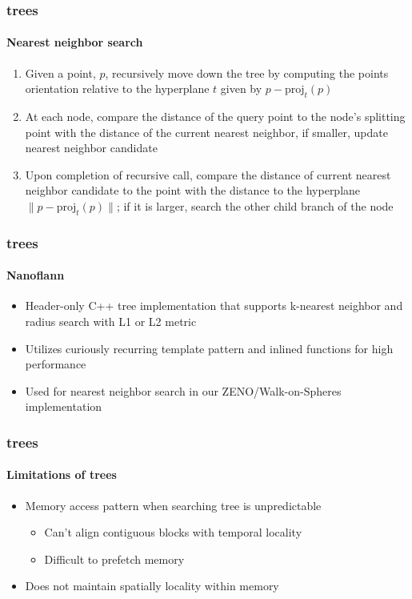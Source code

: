 \begin{frame}
  \frametitle{\kd trees}
  \framesubtitle{Nearest neighbor search}

  \begin{enumerate}
    \item Given a point, $p$, recursively move down the tree by computing the points orientation relative to the 
      hyperplane $t$ given by $p - \text{proj}_t(p)$
    \item At each node, compare the distance of the query point to the node's splitting point with the distance
      of the current nearest neighbor, if smaller, update nearest neighbor candidate
    \item Upon completion of recursive call, compare the distance of current nearest neighbor 
      candidate to the point with the distance to the hyperplane $\|p - \text{proj}_t(p)\|$; 
      if it is larger, search the other child branch of the node
  \end{enumerate}

\end{frame}

\begin{frame}
  \frametitle{\kd trees}
  \framesubtitle{Nanoflann}

  \begin{itemize}
    \item Header-only C++ \kd tree implementation that supports k-nearest neighbor and radius search with 
      L1 or L2 metric
    \item Utilizes curiously recurring template pattern and inlined functions for high performance
    \item Used for nearest neighbor search in our ZENO/Walk-on-Spheres implementation 
  \end{itemize}

\end{frame}


\begin{frame}
  \frametitle{\kd trees}
  \framesubtitle{Limitations of trees}

  \begin{itemize}
    \item Memory access pattern when searching tree is unpredictable
      \begin{itemize}
        \item Can't align contiguous blocks with temporal locality
        \item Difficult to prefetch memory
      \end{itemize}
    \item Does not maintain spatially locality within memory
  \end{itemize}
\end{frame}

